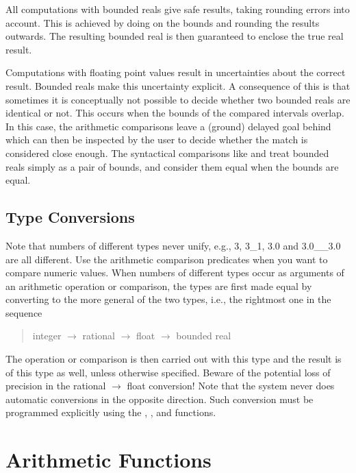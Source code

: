 All computations with bounded reals give safe results, taking rounding
errors into account. This is achieved by doing 
on the bounds and rounding the results outwards. The resulting
bounded real is then guaranteed to enclose the true real result.

Computations with floating point values result in uncertainties
about the correct result. Bounded reals make this uncertainty
explicit. A consequence of this is that sometimes it is conceptually
not possible to decide whether two bounded reals are identical or not.
This occurs when the bounds of the compared intervals overlap.
In this case, the arithmetic comparisons leave a (ground) delayed goal
behind which can then be inspected by the user to decide whether the
match is considered close enough. The syntactical comparisons like
 and
 treat bounded reals
simply as a pair of bounds, and consider them equal when the bounds are
equal.


\subsection{Type Conversions}
Note that numbers of different types never unify, e.g., 3, 3_1, 3.0
and 3.0__3.0 are all different.
Use the arithmetic comparison predicates when you want to
compare numeric values.
When numbers of different types occur as arguments of an arithmetic
operation or comparison, the types are first made equal by converting
to the more general of the two types, i.e., the rightmost one in the sequence
\begin{quote}
integer $\rightarrow$ rational $\rightarrow$ float $\rightarrow$ bounded real
\end{quote}
The operation or comparison is then carried out with this type and the
result is of this type as well, unless otherwise specified.
Beware of the potential loss of precision in the
rational $\rightarrow$ float conversion!
Note that the system never does automatic conversions in the opposite direction.
Such conversion must be programmed explicitly using the
,
,
 and
functions.

\section{Arithmetic Functions}
